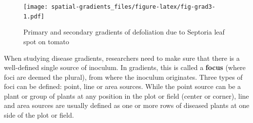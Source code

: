 \documentclass[
  letterpaper,
]{book}
\begin{document}
\begin{figure}

\texttt{[image: spatial-gradients\_files/figure-latex/fig-grad3-1.pdf]} \hfill{}

\caption{\label{fig-grad3}Primary and secondary gradients of defoliation
due to Septoria leaf spot on tomato}

\end{figure}

When studying disease gradients, researchers need to make sure that
there is a well-defined single source of inoculum. In gradients, this is
called a \textbf{focus} (where foci are deemed the plural), from where
the inoculum originates. Three types of foci can be defined: point, line
or area sources. While the point source can be a plant or group of
plants at any position in the plot or field (center or corner), line and
area sources are usually defined as one or more rows of diseased plants
at one side of the plot or field.
\end{document}
